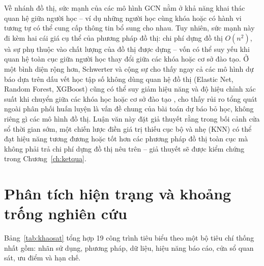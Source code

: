 Về nhánh đồ thị, sức mạnh của các mô hình GCN nằm ở khả năng khai thác quan hệ giữa người học -- ví dụ những người học cùng khóa hoặc có hành vi tương tự có thể cung cấp thông tin bổ sung cho nhau. Tuy nhiên, sức mạnh này đi kèm hai cái giá cụ thể của phương pháp đồ thị: chi phí dựng đồ thị $O(n^2)$, và sự phụ thuộc vào chất lượng của đồ thị được dựng -- vốn có thể suy yếu khi quan hệ toàn cục giữa người học thay đổi giữa các khóa hoặc cơ sở đào tạo. Ở một bình diện rộng hơn, Schwerter và cộng sự cho thấy ngay cả các mô hình dự báo dựa trên dấu vết học tập số không dùng quan hệ đồ thị (Elastic Net, Random Forest, XGBoost) cũng có thể suy giảm hiệu năng và độ hiệu chỉnh xác suất khi chuyển giữa các khóa học hoặc cơ sở đào tạo \cite{Schwerter2026}, cho thấy rủi ro tổng quát ngoài phân phối huấn luyện là vấn đề chung của bài toán dự báo bỏ học, không riêng gì các mô hình đồ thị. Luận văn này đặt giả thuyết rằng trong bối cảnh cửa sổ thời gian sớm, một chiến lược điền giá trị thiếu cục bộ và nhẹ (KNN) có thể đạt hiệu năng tương đương hoặc tốt hơn các phương pháp đồ thị toàn cục mà không phải trả chi phí dựng đồ thị nêu trên -- giả thuyết sẽ được kiểm chứng trong Chương~\ref{ch:ketqua}.

\section{Phân tích hiện trạng và khoảng trống nghiên cứu}
\label{sec:khoangtrong}

Bảng~\ref{tab:khaosat} tổng hợp 19 công trình tiêu biểu theo một bộ tiêu chí thống nhất gồm: nhãn sử dụng, phương pháp, dữ liệu, hiệu năng báo cáo, cửa sổ quan sát, ưu điểm và hạn chế.

